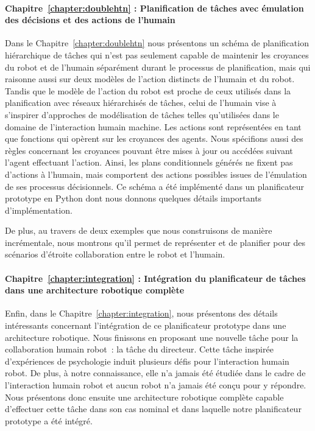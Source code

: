 \paragraph{Chapitre~\ref{chapter:doublehtn} : Planification de tâches avec émulation des décisions et des actions de l'humain}
Dans le Chapitre~\ref{chapter:doublehtn} nous présentons un schéma de planification hiérarchique de tâches qui n'est pas seulement capable de maintenir les croyances du robot et de l'humain séparément durant le processus de planification, mais qui raisonne aussi sur deux modèles de l'action distincts de l'humain et du robot. Tandis que le modèle de l'action du robot est proche de ceux utilisés dans la planification avec réseaux hiérarchisés de tâches, celui de l'humain vise à s'inspirer d'approches de modélisation de tâches telles qu'utilisées dans le domaine de l'interaction humain machine. Les actions sont représentées en tant que fonctions qui opèrent sur les croyances des agents. Nous spécifions aussi des règles concernant les croyances pouvant être mises à jour ou accédées suivant l'agent effectuant l'action. Ainsi, les plans conditionnels générés ne fixent pas d'actions à l'humain, mais comportent des actions possibles issues de l'émulation de ses processus décisionnels. Ce schéma a été implémenté dans un planificateur prototype en Python dont nous donnons quelques détails importants d'implémentation.

De plus, au travers de deux exemples que nous construisons de manière incrémentale, nous montrons qu'il permet de représenter et de planifier pour des scénarios d'étroite collaboration entre le robot et l'humain. 

\paragraph{Chapitre~\ref{chapter:integration} : Intégration du planificateur de tâches dans une architecture robotique complète}
Enfin, dans le Chapitre~\ref{chapter:integration}, nous présentons des détails intéressants concernant l'intégration de ce planificateur prototype dans une architecture robotique. Nous finissons en proposant une nouvelle tâche pour la collaboration humain robot~: la tâche du directeur. Cette tâche inspirée d'expériences de psychologie induit plusieurs défis pour l'interaction humain robot. De plus, à notre connaissance, elle n'a jamais été étudiée dans le cadre de l'interaction humain robot et aucun robot n'a jamais été conçu pour y répondre. Nous présentons donc ensuite une architecture robotique complète capable d'effectuer cette tâche dans son cas nominal et dans laquelle notre planificateur prototype a été intégré.

